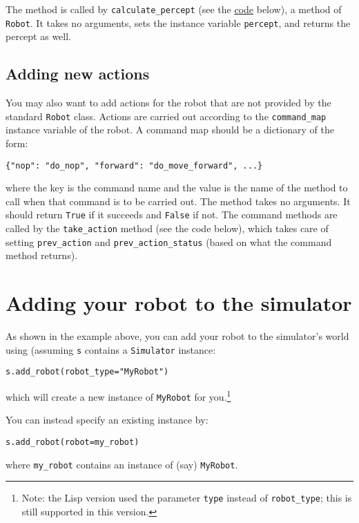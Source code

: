 \documentclass[11pt]{tufte-handout}
\begin{document}
The method is called by \texttt{calculate\_percept} (see the \hyperref[org70b3e8d]{code} below), a method of \texttt{Robot}.  It takes no arguments, sets the instance variable \texttt{percept}, and returns the percept as well.  

\subsection{Adding new actions}
\label{sec:orgf8e40e4}

You may also want to add actions for the robot that are not provided by the standard \texttt{Robot} class.  Actions are carried out according to the \texttt{command\_map} instance variable of the robot.  A command map should be a dictionary of the form: 
\begin{verbatim}
{"nop": "do_nop", "forward": "do_move_forward", ...}
\end{verbatim}

\noindent where the key is the command name and the value is the name of the method to call when that command is to be carried out.  The method takes no arguments. It should return \texttt{True} if it succeeds and \texttt{False} if not.  The command methods are called by the \texttt{take\_action} method (see the code below), which takes care of setting \texttt{prev\_action} and \texttt{prev\_action\_status} (based on what the command method returns).

\section{Adding your robot to the simulator}
\label{sec:orgd7d1342}

As shown in the example above, you can add your robot to the simulator's world using (assuming \texttt{s} contains a \texttt{Simulator} instance:
\begin{verbatim}
s.add_robot(robot_type="MyRobot")
\end{verbatim}

\noindent which will create a new instance of \texttt{MyRobot} for you.\footnote{Note: the Lisp version used the parameter \texttt{type} instead of \texttt{robot\_type}; this is still supported in this version.}  

You can instead specify an existing instance by:
\begin{verbatim}
s.add_robot(robot=my_robot)
\end{verbatim}

\noindent where \texttt{my\_robot} contains an instance of (say) \texttt{MyRobot}.
\end{document}
